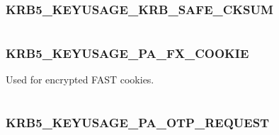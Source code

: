 \documentclass[letterpaper,10pt,english]{sphinxmanual}
\begin{document}
\subsubsection{KRB5\_KEYUSAGE\_KRB\_SAFE\_CKSUM}
\label{appdev/refs/macros/KRB5_KEYUSAGE_KRB_SAFE_CKSUM:krb5-keyusage-krb-safe-cksum-data}\label{appdev/refs/macros/KRB5_KEYUSAGE_KRB_SAFE_CKSUM:krb5-keyusage-krb-safe-cksum}\label{appdev/refs/macros/KRB5_KEYUSAGE_KRB_SAFE_CKSUM::doc}

\begin{fulllineitems}
\label{appdev/refs/macros/KRB5_KEYUSAGE_KRB_SAFE_CKSUM:KRB5_KEYUSAGE_KRB_SAFE_CKSUM}
\end{fulllineitems}


\begin{tabulary}{\linewidth}{|L|L|}
\hline

 & 
\\
\hline\end{tabulary}



\subsubsection{KRB5\_KEYUSAGE\_PA\_FX\_COOKIE}
\label{appdev/refs/macros/KRB5_KEYUSAGE_PA_FX_COOKIE::doc}\label{appdev/refs/macros/KRB5_KEYUSAGE_PA_FX_COOKIE:krb5-keyusage-pa-fx-cookie}\label{appdev/refs/macros/KRB5_KEYUSAGE_PA_FX_COOKIE:krb5-keyusage-pa-fx-cookie-data}

\begin{fulllineitems}
\label{appdev/refs/macros/KRB5_KEYUSAGE_PA_FX_COOKIE:KRB5_KEYUSAGE_PA_FX_COOKIE}
\end{fulllineitems}


Used for encrypted FAST cookies.

\begin{tabulary}{\linewidth}{|L|L|}
\hline

 & 
\\
\hline\end{tabulary}



\subsubsection{KRB5\_KEYUSAGE\_PA\_OTP\_REQUEST}
\label{appdev/refs/macros/KRB5_KEYUSAGE_PA_OTP_REQUEST:krb5-keyusage-pa-otp-request}\label{appdev/refs/macros/KRB5_KEYUSAGE_PA_OTP_REQUEST:krb5-keyusage-pa-otp-request-data}\label{appdev/refs/macros/KRB5_KEYUSAGE_PA_OTP_REQUEST::doc}
\end{document}
